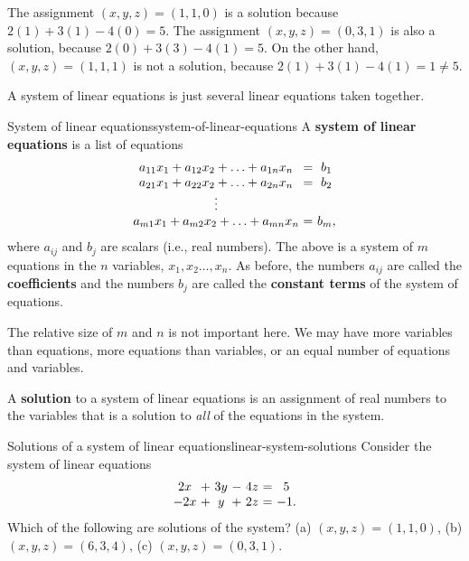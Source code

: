\begin{solution}
  The assignment $(x,y,z) = (1,1,0)$ is a solution because
  $2(1)+3(1)-4(0) = 5$. The assignment $(x,y,z) = (0,3,1)$ is also a
  solution, because $2(0) + 3(3) - 4(1) = 5$. On the other hand,
  $(x,y,z) = (1,1,1)$ is not a solution, because
  $2(1) + 3(1)-4(1) = 1 \neq 5$.
\end{solution}

A system of linear equations is just several linear equations taken together.

\begin{definition}{System of linear equations}{system-of-linear-equations}
A \textbf{system of linear equations} is a list of equations
\begin{equation*}
\begin{array}{c@{~}c@{~}c}
a_{11}x_{1}+a_{12}x_{2}+\ldots+a_{1n}x_{n}&=&b_{1} \\
a_{21}x_{1}+a_{22}x_{2}+\ldots+a_{2n}x_{n}&=&b_{2} \\
\vdots \\
a_{m1}x_{1}+a_{m2}x_{2}+\ldots+a_{mn}x_{n}&=&b_{m},
\end{array}
\end{equation*}
where $a_{ij}$ and $b_{j}$ are scalars (i.e., real numbers). The above
is a system of $m$ equations in the $n$ variables,
$x_{1},x_{2}\ldots,x_{n}$.  As before, the numbers $a_{ij}$ are
called the \textbf{coefficients} and the numbers
$b_{j}$ are called the \textbf{constant terms} of
the system of equations.
\end{definition}

The relative size of $m$ and $n$ is not important here. We may have
more variables than equations, more equations than variables, or an
equal number of equations and variables. 

A \textbf{solution} to a
system of linear equations is an assignment of real numbers to the
variables that is a solution to {\em all} of the equations in the
system.

\begin{example}{Solutions of a system of linear equations}{linear-system-solutions}
  Consider the system of linear equations
  \begin{equation*}
    \begin{array}{c@{~}c@{~}c@{~}c@{~}c@{~}c@{~}c}
      2x&+&3y&-&4z &=& 5\\
      -2x&+&y&+&2z &=& -1.
    \end{array}
  \end{equation*}  
  Which of the following are solutions of the system? (a)
  $(x,y,z)=(1,1,0)$, (b) $(x,y,z)=(6,3,4)$, (c) $(x,y,z)=(0,3,1)$.
\end{example}

